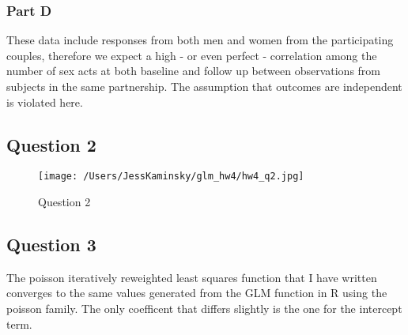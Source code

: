 \documentclass[]{article}
\begin{document}
\subsubsection{Part D}\label{part-d}

These data include responses from both men and women from the
participating couples, therefore we expect a high - or even perfect -
correlation among the number of sex acts at both baseline and follow up
between observations from subjects in the same partnership. The
assumption that outcomes are independent is violated here.

\subsection{Question 2}\label{question-2}

\begin{figure}[htbp]
\centering
\texttt{[image: /Users/JessKaminsky/glm\_hw4/hw4\_q2.jpg]}
\caption{Question 2}
\end{figure}

\subsection{Question 3}\label{question-3}

The poisson iteratively reweighted least squares function that I have
written converges to the same values generated from the GLM function in
R using the poisson family. The only coefficent that differs slightly is
the one for the intercept term.
\end{document}
